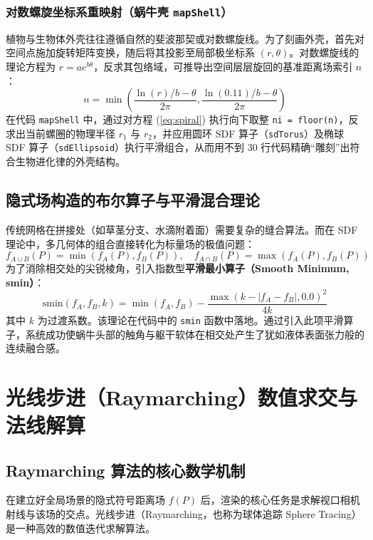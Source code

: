 \documentclass[11pt, a4paper, oneside]{report}
\newcommand{\keyword}[1]{\textbf{#1}}
\newcommand{\code}[1]{\texttt{#1}}
\begin{document}
\subsection{ 对数螺旋坐标系重映射（蜗牛壳 \code{mapShell}）}
植物与生物体外壳往往遵循自然的斐波那契或对数螺旋线。为了刻画外壳，首先对空间点施加旋转矩阵变换，随后将其投影至局部极坐标系 $(r, \theta)$。对数螺旋线的理论方程为 $r = a e^{b\theta}$，反求其包络域，可推导出空间层层旋回的基准距离场索引 $n$：
\begin{equation}
\label{eq:spiral}
n = \min\left(\frac{\ln(r)/b - \theta}{2\pi}, \frac{\ln(0.11)/b - \theta}{2\pi}\right)
\end{equation}
在代码 \code{mapShell} 中，通过对方程 (\ref{eq:spiral}) 执行向下取整 \code{ni = floor(n)}，反求出当前螺圈的物理半径 $r_1$ 与 $r_2$，并应用圆环 SDF 算子（\code{sdTorus}）及椭球 SDF 算子（\code{sdEllipsoid}）执行平滑组合，从而用不到 30 行代码精确“雕刻”出符合生物进化律的外壳结构。

\section{隐式场构造的布尔算子与平滑混合理论}
传统网格在拼接处（如草茎分支、水滴附着面）需要复杂的缝合算法。而在 SDF 理论中，多几何体的组合直接转化为标量场的极值问题：
\begin{equation}
f_{A \cup B}(P) = \min(f_A(P), f_B(P)), \quad f_{A \cap B}(P) = \max(f_A(P), f_B(P))
\end{equation}
为了消除相交处的尖锐棱角，引入指数型\keyword{平滑最小算子（Smooth Minimum, smin）}：
\begin{equation}
\text{smin}(f_A, f_B, k) = \min(f_A, f_B) - \frac{\max(k-|f_A-f_B|, 0.0)^2}{4k}
\end{equation}
其中 $k$ 为过渡系数。该理论在代码中的 \code{smin} 函数中落地。通过引入此项平滑算子，系统成功使蜗牛头部的触角与躯干软体在相交处产生了犹如液体表面张力般的连续融合感。

\chapter{光线步进（Raymarching）数值求交与法线解算}
\section{Raymarching 算法的核心数学机制}
在建立好全局场景的隐式符号距离场 $f(P)$ 后，渲染的核心任务是求解视口相机射线与该场的交点。光线步进（Raymarching，也称为球体追踪 Sphere Tracing）是一种高效的数值迭代求解算法。
\end{document}
